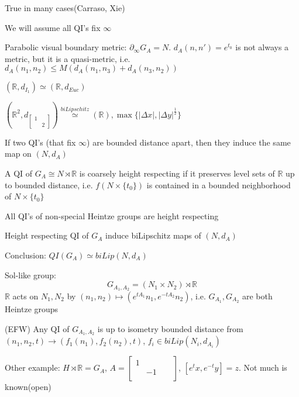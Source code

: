 \documentclass[main]{subfiles}
\begin{document}
\begin{remark}
True in many cases(Carraso, Xie)
\end{remark}

We will assume all QI's fix $\infty$

Parabolic visual boundary metric: $\partial_\infty G_A=N$. $d_A(n,n')=e^{t_0}$ is not always a metric, but it is a quasi-metric, i.e. $d_A(n_1,n_2)\leq M(d_A(n_1,n_3)+d_A(n_3,n_2))$

$(\mathbb R,d_{I_1})\simeq(\mathbb R,d_{Euc})$

$(\mathbb R^2,d_{\begin{bmatrix}
1\\
&2
\end{bmatrix}})\overset{biLipschitz}{\simeq}(\mathbb R),\max\{|\Delta x|,|\Delta y|^{\frac{1}{2}}\}$

\begin{exercise}
If two QI's (that fix $\infty$) are bounded distance apart, then they induce the same map on $(N,d_A)$
\end{exercise}

\begin{definition}
A QI of $G_A\cong N\rtimes\mathbb R$ is coarsely height respecting if it preserves level sets of $\mathbb R$ up to bounded distance, i.e. $f(N\times\{t_0\})$ is contained in a bounded neighborhood of $N\times\{t_0\}$
\end{definition}

\begin{conjecture}
All QI's of non-special Heintze groups are height respecting
\end{conjecture}

\begin{exercise}
Height respecting QI of $G_A$ induce biLipschitz maps of $(N,d_A)$
\end{exercise}

Conclusion: $QI(G_A)\simeq biLip(N,d_A)$

Sol-like group:
\[G_{A_1,A_2}=(N_1\times N_2)\rtimes\mathbb R\]
$\mathbb R$ acts on $N_1,N_2$ by $(n_1,n_2)\mapsto(e^{tA_1}n_1,e^{-tA_2}n_2)$, i.e. $G_{A_1},G_{A_2}$ are both Heintze groups

(EFW) Any QI of $G_{A_1,A_2}$ is up to isometry bounded distance from $(n_1,n_2,t)\to(f_1(n_1),f_2(n_2),t)$, $f_i\in biLip(N_i,d_{A_i})$

Other example: $H\rtimes\mathbb R=G_A$, $A=\begin{bmatrix}
1\\
&-1\\
&&&
\end{bmatrix}$, $[e^tx,e^{-t}y]=z$. Not much is known(open)
\end{document}
